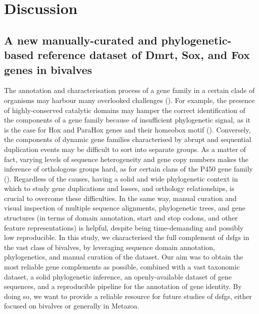 \section{Discussion} \label{chpater3_discussion}
\subsection{A new manually-curated and phylogenetic-based reference dataset of Dmrt, Sox, and Fox genes in bivalves}
The annotation and characterisation process of a gene family in a certain clade of organisms may harbour many overlooked challenges (\textbf{\cite{vizueta2020bitacora}}). For example, the presence of highly-conserved catalytic domains may hamper the correct identification of the components of a gene family because of insufficient phylogenetic signal, as it is the case for Hox and ParaHox genes and their homeobox motif (\textbf{\cite{baldwin2018new, nicolini2023comparative}}). Conversely, the components of dynamic gene families characterised by abrupt and sequential duplication events may be difficult to sort into separate groups. As a matter of fact, varying levels of sequence heterogeneity and gene copy numbers makes the inference of orthologous groups hard, as for certain clans of the P450 gene family (\textbf{\cite{dermauw2020diversity}}). Regardless of the causes, having a solid and wide phylogenetic context in which to study gene duplications and losses, and orthology relationships, is crucial to overcome these difficulties. In the same way, manual curation and visual inspection of multiple sequence alignments, phylogenetic trees, and gene structures (in terms of domain annotation, start and stop codons, and other feature representations) is helpful, despite being time-demanding and possibly low reproducible. In this study, we characterised the full complement of \glspl{dsfg} in the vast class of bivalves, by leveraging sequence domain annotation, phylogenetics, and manual curation of the dataset. Our aim was to obtain the most reliable gene complements as possible, combined with a vast taxonomic dataset, a solid phylogenetic inference, an openly-available dataset of gene sequences, and a reproducible pipeline for the annotation of gene identity. By doing so, we want to provide a reliable resource for future studies of \glspl{dsfg}, either focused on bivalves or generally in Metazoa.

